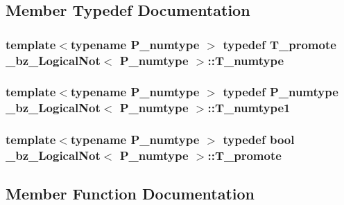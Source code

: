 \subsection{Member Typedef Documentation}
\hypertarget{class__bz__LogicalNot_a070a333bdbec474e448ffb76bdc06a4a}{}
\subsubsection[{T\+\_\+numtype}]{\setlength{\rightskip}{0pt plus 5cm}template$<$typename P\+\_\+numtype $>$ typedef {\bf T\+\_\+promote} {\bf \+\_\+bz\+\_\+\+Logical\+Not}$<$ P\+\_\+numtype $>$\+::{\bf T\+\_\+numtype}}\label{class__bz__LogicalNot_a070a333bdbec474e448ffb76bdc06a4a}
\hypertarget{class__bz__LogicalNot_aaf341c21676543e595e5835b96b8f621}{}
\subsubsection[{T\+\_\+numtype1}]{\setlength{\rightskip}{0pt plus 5cm}template$<$typename P\+\_\+numtype $>$ typedef P\+\_\+numtype {\bf \+\_\+bz\+\_\+\+Logical\+Not}$<$ P\+\_\+numtype $>$\+::{\bf T\+\_\+numtype1}}\label{class__bz__LogicalNot_aaf341c21676543e595e5835b96b8f621}
\hypertarget{class__bz__LogicalNot_aed00b59116abe21507d86e0365617d07}{}
\subsubsection[{T\+\_\+promote}]{\setlength{\rightskip}{0pt plus 5cm}template$<$typename P\+\_\+numtype $>$ typedef {\bf bool} {\bf \+\_\+bz\+\_\+\+Logical\+Not}$<$ P\+\_\+numtype $>$\+::{\bf T\+\_\+promote}}\label{class__bz__LogicalNot_aed00b59116abe21507d86e0365617d07}


\subsection{Member Function Documentation}
\hypertarget{class__bz__LogicalNot_a95278d5adb71972a713e3147e702d67d}{}
